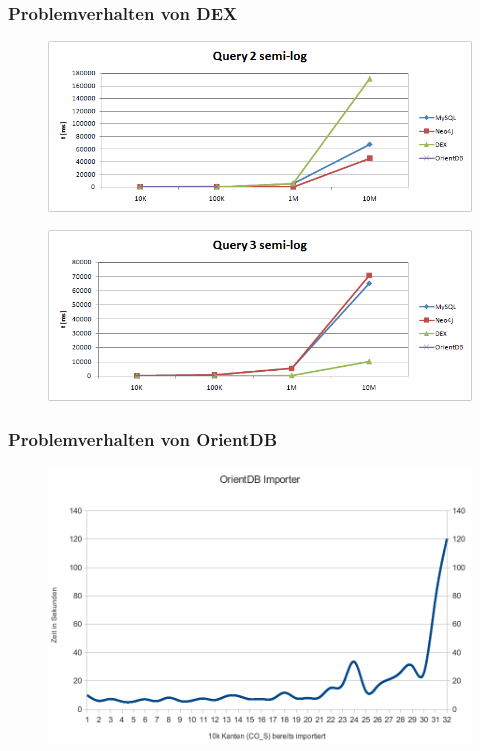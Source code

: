 \documentclass{beamer}
\begin{document}
\begin{frame}\frametitle{Problemverhalten von DEX}
\begin{figure}[ht]
\centering
\includegraphics[scale=0.3]{../results/cold caches/images/query2_semi-log}
\label{fig:mysql_schema}
\end{figure}
\begin{figure}[ht]
\centering
\includegraphics[scale=0.3]{../results/cold caches/images/query3_semi-log}
\label{fig:mysql_schema}
\end{figure}
\end{frame}

\begin{frame}\frametitle{Problemverhalten von OrientDB}
\begin{figure}[ht]
\centering
\includegraphics[scale=0.28]{../report/pics/OrientImporter}
\label{fig:mysql_schema}
\end{figure}
\end{frame}
\end{document}
